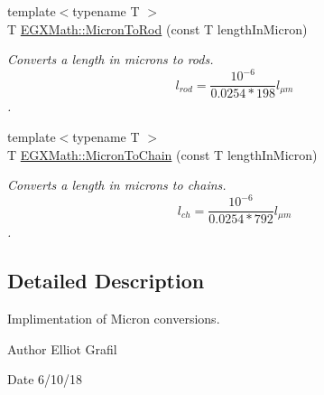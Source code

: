 \begin{DoxyCompactItemize}
{\footnotesize template$<$typename T $>$ }\\T \mbox{\hyperlink{group___e_g_x_math-_conversions-_length_conversions-_non-_s_i-_micron-_surveyors_gae81e23a6186148740d3b610089ba3c2e}{E\+G\+X\+Math\+::\+Micron\+To\+Rod}} (const T length\+In\+Micron)
\begin{DoxyCompactList}\small\item\em Converts a length in microns to rods. \[ l_{rod}= \frac{10^{-6}}{0.0254 * 198} l_{\mu m} \]. \end{DoxyCompactList}\item 
{\footnotesize template$<$typename T $>$ }\\T \mbox{\hyperlink{group___e_g_x_math-_conversions-_length_conversions-_non-_s_i-_micron-_surveyors_ga35d9a4c6d414802981ea103491e458bd}{E\+G\+X\+Math\+::\+Micron\+To\+Chain}} (const T length\+In\+Micron)
\begin{DoxyCompactList}\small\item\em Converts a length in microns to chains. \[ l_{ch}= \frac{10^{-6}}{0.0254 * 792} l_{\mu m} \]. \end{DoxyCompactList}\end{DoxyCompactItemize}


\subsection{Detailed Description}
Implimentation of Micron conversions. 

\begin{DoxyAuthor}{Author}
Elliot Grafil 
\end{DoxyAuthor}
\begin{DoxyDate}{Date}
6/10/18 
\end{DoxyDate}
